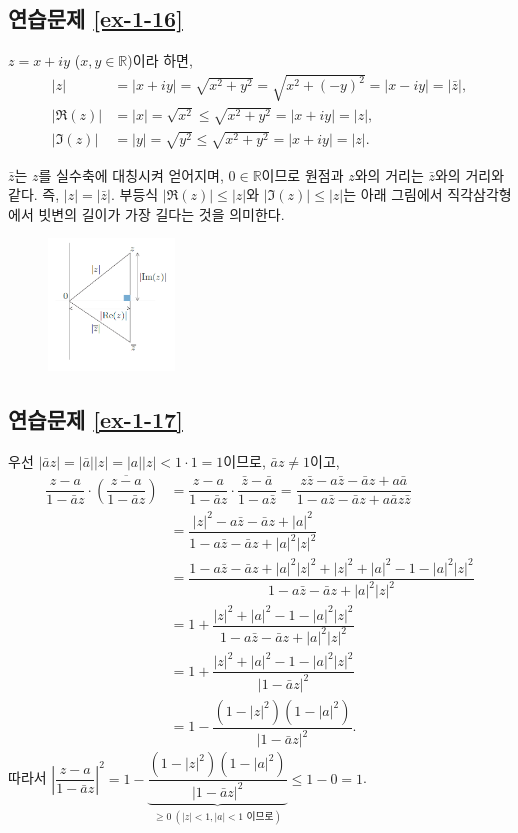 \subsection*{연습문제 \ref{ex-1-16}}

$z = x+iy$ ($x,y\in\mathbb R$)이라 하면,
\begin{align*}
|z| &= |x+iy| = \sqrt{x^2+y^2} = \sqrt{x^2+(-y)^2} = |x-iy| = |\bar z|, \\
|\Re(z)| & =  |x| = \sqrt{x^2} \le  \sqrt{x^2+y^2} = |x+iy| = |z|, \\
|\Im(z)| &= |y| = \sqrt{y^2} \le  \sqrt{x^2+y^2} = |x+iy| = |z|.
\end{align*}

$\bar z$는 $z$를 실수축에 대칭시켜 얻어지며,
$0\in\mathbb R$이므로 원점과 $z$와의 거리는 $\bar z$와의 거리와 같다.
즉, $ |z| = |\bar z|$.
부등식 $|\Re(z)| \le|z|$와 $|\Im(z)|\le |z|$는 
아래 그림에서 직각삼각형에서 빗변의 길이가 가장 길다는 것을 의미한다.

\begin{figure}[h!]
\begin{center}
\includegraphics[width=0.3\textwidth]{./Solution/figs/fig-s-0-1}
\end{center}
\end{figure}

\subsection*{연습문제 \ref{ex-1-17}}

우선 $|\bar az| = |\bar a||z| = |a||z| <1\cdot 1 =1$이므로, $\bar az \ne 1$이고,
\begin{align*}
\dfrac{z-a}{1-\bar az}\cdot \overline{\left(\dfrac{z-a}{1-\bar az}\right)}
&= \dfrac{z-a}{1-\bar az}\cdot \dfrac{\bar z-\bar a}{1-a\bar z}
= \dfrac{z\bar z - a\bar z - \bar a z+a\bar a}{1-a\bar z - \bar a z + a\bar a z \bar z} \\
&= \dfrac{|z|^2 - a\bar z - \bar a z + |a|^2}{1-a\bar z - \bar a z + |a|^2|z|^2} \\
&= \dfrac{1 - a\bar z - \bar a z + |a|^2|z|^2+|z|^2+|a|^2-1-|a|^2|z|^2}
{1-a\bar z - \bar a z + |a|^2|z|^2} \\
&= 1 + \dfrac{|z|^2+|a|^2-1-|a|^2|z|^2}{1-a\bar z - \bar a z + |a|^2|z|^2} \\
&= 1 + \dfrac{|z|^2+|a|^2-1-|a|^2|z|^2}{|1- \bar a z|^2} \\
&= 1 -  \dfrac{(1-|z|^2)(1-|a|^2)}{|1- \bar a z|^2}.
\end{align*}
따라서
$\left| \dfrac{z-a}{1-\bar az} \right|^2 = 1 -
\underbrace{\dfrac{(1-|z|^2)(1-|a|^2)}{|1- \bar a z|^2}}_{\ge0\ (|z|<1, |a|<1\text{ 이므로})}
\le 1-0 = 1$.

